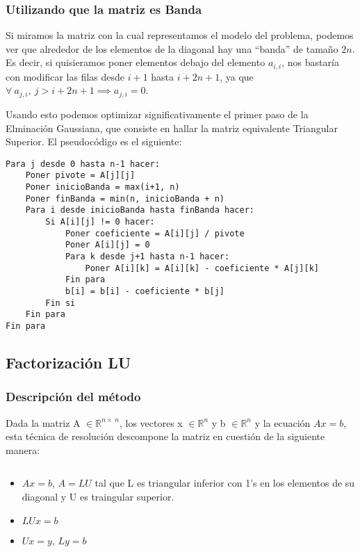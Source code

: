 \subsubsection{Utilizando que la matriz es Banda}

Si miramos la matriz con la cual representamos el modelo del problema, podemos ver que alrededor de los elementos de la diagonal hay una ``banda'' de tamaño $2n$.
Es decir, si quisieramos poner elementos debajo del elemento $a_{i,i}$, nos bastaría con modificar las filas desde $i+1$ hasta $i+2n+1$, ya que $\forall\ a_{j,i},\ j> i+2n+1 \implies a_{j,i} = 0$.

Usando esto podemos optimizar significativamente el primer paso de la Elminación Gaussiana, que consiste en hallar la matriz equivalente Triangular Superior. El pseudocódigo es el siguiente:

\begin{lstlisting}
Para j desde 0 hasta n-1 hacer:
    Poner pivote = A[j][j]
    Poner inicioBanda = max(i+1, n)
    Poner finBanda = min(n, inicioBanda + n)
    Para i desde inicioBanda hasta finBanda hacer:
        Si A[i][j] != 0 hacer:
            Poner coeficiente = A[i][j] / pivote
            Poner A[i][j] = 0
            Para k desde j+1 hasta n-1 hacer:
                Poner A[i][k] = A[i][k] - coeficiente * A[j][k]
            Fin para
            b[i] = b[i] - coeficiente * b[j]
        Fin si
    Fin para
Fin para
\end{lstlisting}

\subsection{Factorización LU}

\subsubsection{Descripción del método}

Dada la matriz A $\in \mathbb{R}^{n \times\ n}$, los vectores x $\in \mathbb{R}^{n}$ y b $\in \mathbb{R}^{n}$ y la ecuación $Ax = b$, esta técnica de resolución descompone la matriz en cuestión de la siguiente manera:

\begin{lstlisting}

\end{lstlisting}


\begin{itemize}
    \item $Ax = b$, $A = LU$ tal que L es triangular inferior con 1's en los elementos de su diagonal y U es traingular superior.
    \item $LUx = b$
    \item $Ux = y$, $Ly = b$
\end{itemize}

